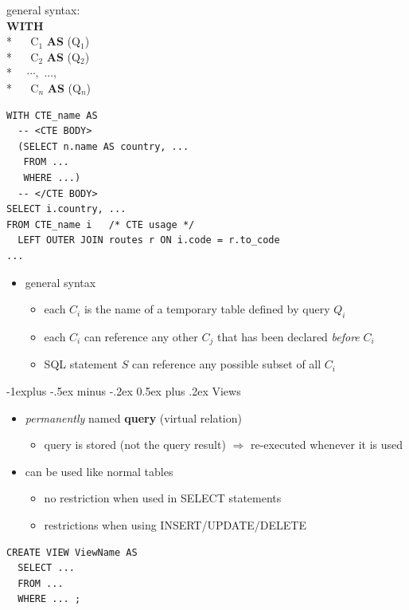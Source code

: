 \documentclass[10pt, landscape]{article}
\makeatletter
\renewcommand{\subsection}{\@startsection{subsection}{2}{0mm}%
  {-1explus -.5ex minus -.2ex}%
  {0.5ex plus .2ex}%
{\normalfont\normalsize\bfseries}}
\makeatother
\begin{document}
\begin{multicols}{3}
  \begin{minipage}[c]{0.2\linewidth}
    general syntax:
    \\ \textbf{WITH}
    \\* $\quad$ C$_1$ \textbf{AS} (Q$_1$)
    \\* $\quad$ C$_2$ \textbf{AS} (Q$_2$)
    \\* $\quad \cdots,$ ...,
    \\* $\quad$ C$_n$ \textbf{AS} (Q$_n$)
  \end{minipage}
  \begin{minipage}[c]{0.75\linewidth}
    \begin{lstlisting}[style=mySQL]
WITH CTE_name AS 
  -- <CTE BODY>
  (SELECT n.name AS country, ...
   FROM ...
   WHERE ...)
  -- </CTE BODY>
SELECT i.country, ...
FROM CTE_name i   /* CTE usage */ 
  LEFT OUTER JOIN routes r ON i.code = r.to_code
...
    \end{lstlisting}
  \end{minipage}

  \begin{itemize}
    \item general syntax
      \begin{itemize}
        \item each $C_i$ is the name of a temporary table defined by query $Q_i$ 
        \item each $C_i$ can reference any other $C_j$ that has been declared \textit{before} $C_i$ 
        \item SQL statement $S$ can reference any possible subset of all $C_i$
      \end{itemize}
  \end{itemize}

  \subsection{Views}
  \begin{itemize}
    \item \textit{permanently} named \textbf{query} (virtual relation)
      \begin{itemize}
        \item query is stored (not the query result) $\Rightarrow$ re-executed whenever it is used
      \end{itemize}
    \item can be used like normal tables
      \begin{itemize}
        \item no restriction when used in SELECT statements
        \item restrictions when using INSERT/UPDATE/DELETE
      \end{itemize}
  \end{itemize}
  \begin{lstlisting}[style=mySQL]
CREATE VIEW ViewName AS
  SELECT ...
  FROM ...
  WHERE ... ;
  \end{lstlisting}


\end{multicols}
\end{document}

